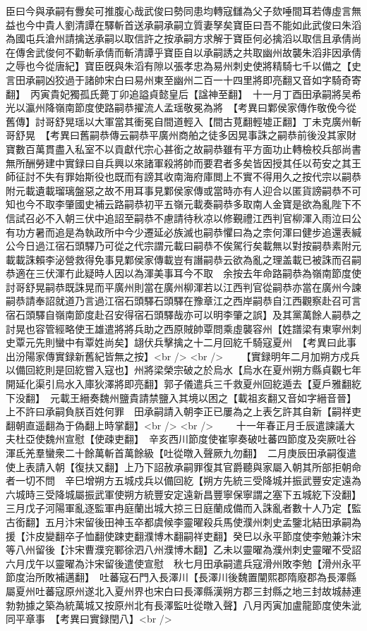 臣曰今與承嗣有釁矣可推腹心哉武俊曰勢同患均轉寇讎為父子欬唾間耳若傳虛言無益也今中貴人劉清譚在驛斬首送承嗣承嗣立質妻孥矣寶臣曰吾不能如此武俊曰朱滔為國屯兵滄州請擒送承嗣以取信許之按承嗣方求解于寶臣何必擒滔以取信且承倩尚在傳舍武俊何不勸斬承倩而斬清譚乎寶臣自以承嗣誘之共取幽州故襲朱滔非因承倩之辱也今從唐紀】寶臣旣與朱滔有隙以張孝忠為易州刺史使將精騎七千以備之【史言田承嗣凶狡過于諸帥宋白曰易州東至幽州二百一十四里將即亮翻又音如字騎奇寄翻】　丙寅貴妃獨孤氏薨丁卯追謚貞懿皇后【諡神至翻】　十一月丁酉田承嗣將吴希光以瀛州降嶺南節度使路嗣恭擢流人孟瑶敬冕為將　【考異曰鄴侯家傳作敬俛今從舊傳】討哥舒晃瑶以大軍當其衝冕自間道輕入【間古莧翻輕墟正翻】丁未克廣州斬哥舒晃　【考異曰舊嗣恭傳云嗣恭平廣州商舶之徒多因晃事誅之嗣恭前後没其家財寶數百萬貫盡入私室不以貢獻代宗心甚銜之故嗣恭雖有平方面功止轉檢校兵部尚書無所酬勞建中實録曰自兵興以來諸軍殺將帥而要君者多矣皆因授其任以苟安之其王師征討不失有罪始斯役也既而有謗其收南海府庫閲上不實不得用久之按代宗以嗣恭附元載遺載瑠璃盤惡之故不用耳事見鄴侯家傳或當時亦有人迎合以匿貨謗嗣恭不可知也今不取李肇國史補云路嗣恭初平五嶺元載奏嗣恭多取南人金寶是欲為亂陛下不信試召必不入朝三伏中追詔至嗣恭不慮請待秋凉以修覲禮江西判官柳渾入雨泣曰公有功方暑而追是為執政所中今少遷延必族滅也嗣恭懼曰為之柰何渾曰健步追還表緘公今日過江宿石頭驛乃可從之代宗謂元載曰嗣恭不俟駕行矣載無以對按嗣恭素附元載載誅賴李泌營救得免事見鄴侯家傳載豈有譖嗣恭云欲為亂之理盖載已被誅而召嗣恭適在三伏渾冇此疑時人因以為渾美事耳今不取　余按去年命路嗣恭為嶺南節度使討哥舒晃嗣恭既誅晃而平廣州則當在廣州柳渾若以江西判官從嗣恭亦當在廣州今諫嗣恭請奉詔就道乃言過江宿石頭驛石頭驛在豫章江之西岸嗣恭自江西觀察赴召可言宿石頭驛自嶺南節度赴召安得宿石頭驛哉亦可以明李肇之誤】及其黨萬餘人嗣恭之討晃也容管經略使王雄遣將將兵助之西原賊帥覃問乘虛襲容州【姓譜梁有東寧州刺史覃元先則蠻中有覃姓尚矣】翃伏兵擊擒之十二月回紇千騎寇夏州　【考異曰此事出汾陽家傳實録新舊紀皆無之按】<br />
<br />
　　【實録明年二月加朔方戍兵以備回紇則是回紇嘗入寇也】州將梁榮宗破之於烏水【烏水在夏州朔方縣貞觀七年開延化渠引烏水入庫狄澤將即亮翻】郭子儀遣兵三千救夏州回紇遁去【夏戶雅翻紇下没翻】　元載王縉奏魏州鹽貴請禁鹽入其境以困之【載祖亥翻又音如字縉音晉】上不許曰承嗣負朕百姓何罪　田承嗣請入朝李正已屢為之上表乞許其自新【嗣祥吏翻朝直遥翻為于偽翻上時掌翻】<br />
<br />
　　十一年春正月壬辰遣諫議大夫杜亞使魏州宣慰【使疎吏翻】　辛亥西川節度使崔寧奏破吐蕃四節度及突厥吐谷渾氐羌羣蠻衆二十餘萬斬首萬餘級【吐從暾入聲厥九勿翻】　二月庚辰田承嗣復遣使上表請入朝【復扶又翻】上乃下詔赦承嗣罪復其官爵聽與家屬入朝其所部拒朝命者一切不問　辛巳增朔方五城戍兵以備回紇【朔方先統三受降城并振武豐安定遠為六城時三受降城屬振武軍使朔方統豐安定遠新昌豐寧保寧謂之塞下五城紇下没翻】　三月戊子河陽軍亂逐監軍冉庭蘭出城大掠三日庭蘭成備而入誅亂者數十人乃定【監古銜翻】五月汴宋留後田神玉卒都虞候李靈曜殺兵馬使濮州刺史孟鑒北結田承嗣為援【汴皮變翻卒子恤翻使踈吏翻濮博木翻嗣祥吏翻】癸巳以永平節度使李勉兼汴宋等八州留後【汴宋曹濮兖鄆徐泗八州濮博木翻】乙未以靈曜為濮州刺史靈曜不受詔六月戊午以靈曜為汴宋留後遣使宣慰　秋七月田承嗣遣兵寇滑州敗李勉【滑州永平節度治所敗補邁翻】　吐蕃寇石門入長澤川【長澤川後魏置闡熙郡隋廢郡為長澤縣屬夏州吐蕃寇原州遂北入夏州界也宋白曰長澤縣漢朔方郡三封縣之地三封故城赫連勃勃據之築為統萬城又按原州北有長澤監吐從暾入聲】八月丙寅加盧龍節度使朱泚同平章事　【考異曰實録閏八】<br />

